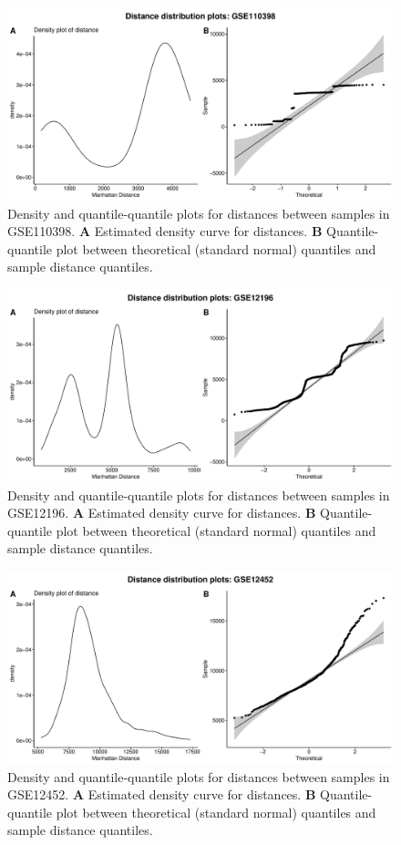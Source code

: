 \documentclass[10pt,letterpaper]{article}\usepackage[]{graphicx}\usepackage[]{color}
\begin{document}
\begin{figure}[H]
	\includegraphics[width=\textwidth]{manhattan-distance_hist_GSE110398.pdf}
	\caption{Density and quantile-quantile plots for distances between samples in GSE110398. \textbf{A} Estimated density curve for distances. \textbf{B} Quantile-quantile plot between theoretical (standard normal) quantiles and sample distance quantiles.}
\end{figure}

\begin{figure}[H]
	\includegraphics[width=\textwidth]{manhattan-distance_hist_GSE12196.pdf}
	\caption{Density and quantile-quantile plots for distances between samples in GSE12196. \textbf{A} Estimated density curve for distances. \textbf{B} Quantile-quantile plot between theoretical (standard normal) quantiles and sample distance quantiles.}
\end{figure}

\begin{figure}[H]
	\includegraphics[width=\textwidth]{manhattan-distance_hist_GSE12452.pdf}
	\caption{Density and quantile-quantile plots for distances between samples in GSE12452. \textbf{A} Estimated density curve for distances. \textbf{B} Quantile-quantile plot between theoretical (standard normal) quantiles and sample distance quantiles.}
\end{figure}
\end{document}
